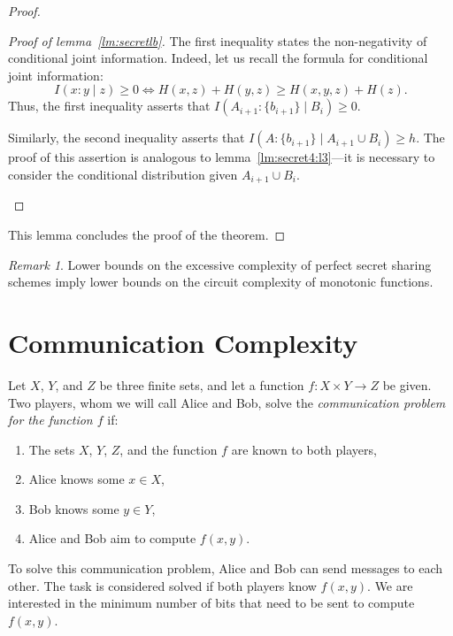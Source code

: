 \documentclass[12pt,sans]{article}
\theoremstyle{definition}
\theoremstyle{plain}
\theoremstyle{remark}
\newtheorem{remark}{Remark}[section]
\begin{document}
\begin{proof}
\begin{proof}[Proof of lemma~\ref{lm:secretlb}]
        The first inequality states the non-negativity of conditional joint information.
        Indeed, let us recall the formula for conditional joint information:
        \[
        I(x:y \mid z) \ge 0 \iff H(x,z) + H(y,z) \ge H(x,y,z) + H(z).
        \]
        Thus, the first inequality asserts that $I(A_{i+1} : \{b_{i+1}\} \mid B_i) \ge 0$.

        Similarly, the second inequality asserts that $I(A : \{b_{i+1}\} \mid A_{i+1} \cup B_i) \ge h$.
        The proof of this assertion is analogous to lemma~\ref{lm:secret4:l3}—it is necessary to consider the conditional distribution given $A_{i+1} \cup B_i$.
        \begin{center}
        \end{center}
    \end{proof}
    This lemma concludes the proof of the theorem.
\end{proof}

\begin{remark}
    Lower bounds on the excessive complexity of perfect secret sharing schemes imply lower bounds on the circuit complexity of monotonic functions.
\end{remark}



\section{Communication Complexity}
Let $X$, $Y$, and $Z$ be three finite sets, and let a function $f: X \times Y \to Z$ be given. Two players, whom we will call Alice and Bob, solve the \emph{communication problem for the function $f$} if:
\begin{enumerate}
    \item The sets $X$, $Y$, $Z$, and the function $f$ are known to both players,
    \item Alice knows some $x \in X$,
    \item Bob knows some $y \in Y$,
    \item Alice and Bob aim to compute $f(x,y)$.
\end{enumerate}
To solve this communication problem, Alice and Bob can send messages to each other. The task is considered solved if both players know $f(x,y)$. We are interested in the minimum number of bits that need to be sent to compute $f(x,y)$.
\end{document}
